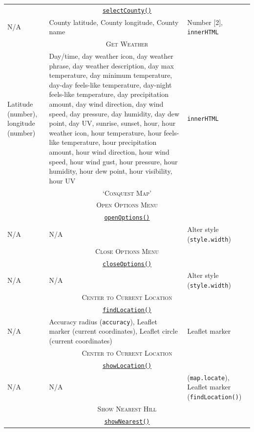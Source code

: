 \documentclass[11pt, english]{article}
\begin{document}
\begin{center}
\begin{longtable}{p{4cm}p{6cm}p{2cm}}
		\multicolumn{3}{c}{\underline{\texttt{selectCounty()}}}\\
		N/A & County latitude, County longitude, County name & Number [2], \texttt{innerHTML}\\
		\hline
		\multicolumn{3}{c}{\textsc{Get Weather}}\\
		\hline
		Latitude (number), longitude (number) & Day/time, day weather icon, day weather phrase, day weather description, day max temperature, day minimum temperature, day-day feels-like temperature, day-night feels-like temperature, day precipitation amount, day wind direction, day wind speed, day pressure, day humidity, day dew point, day UV, sunrise, sunset, hour, hour weather icon, hour temperature, hour feels-like temperature, hour precipitation amount, hour wind direction, hour wind speed, hour wind gust, hour pressure, hour humidity, hour dew point, hour visibility, hour UV & \texttt{innerHTML}\\
		\hline
		\hline
		\multicolumn{3}{c}{\textsc{`Conquest Map'}}\\
		\hline
		\hline
		\multicolumn{3}{c}{\textsc{Open Options Menu}}\\
		\hline
		\multicolumn{3}{c}{\underline{\texttt{openOptions()}}}\\
		N/A & N/A & Alter style (\texttt{style.width})\\
		\hline
		\multicolumn{3}{c}{\textsc{Close Options Menu}}\\
		\hline
		\multicolumn{3}{c}{\underline{\texttt{closeOptions()}}}\\
		N/A & N/A & Alter style (\texttt{style.width})\\
		\hline
		\multicolumn{3}{c}{\textsc{Center to Current Location}}\\
		\hline
		\multicolumn{3}{c}{\underline{\texttt{findLocation()}}}\\
		N/A & Accuracy radius (\texttt{accuracy}), Leaflet marker (current coordinates), Leaflet circle (current coordinates) & Leaflet marker\\
		\hline
		\multicolumn{3}{c}{\textsc{Center to Current Location}}\\
		\hline
		\multicolumn{3}{c}{\underline{\texttt{showLocation()}}}\\
		N/A & N/A & (\texttt{map.locate}), Leaflet marker (\texttt{findLocation()})\\
		\hline
		\multicolumn{3}{c}{\textsc{Show Nearest Hill}}\\
		\hline
		\multicolumn{3}{c}{\underline{\texttt{showNearest()}}}\\

\end{longtable}
\end{center}
\end{document}
